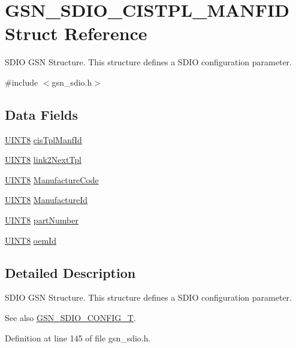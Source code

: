 \hypertarget{a00222}{
\section{GSN\_\-SDIO\_\-CISTPL\_\-MANFID Struct Reference}
\label{a00222}
}


SDIO GSN Structure. This structure defines a SDIO configuration parameter.  




{\ttfamily \#include $<$gsn\_\-sdio.h$>$}

\subsection*{Data Fields}
\begin{DoxyCompactItemize}
\item 
\hyperlink{a00660_gab27e9918b538ce9d8ca692479b375b6a}{UINT8} \hyperlink{a00222_a70e8c53219dd22a1c86848ec328b00b4}{cisTplManfId}
\item 
\hyperlink{a00660_gab27e9918b538ce9d8ca692479b375b6a}{UINT8} \hyperlink{a00222_adb5f177f5de86565991790a9c2c079b5}{link2NextTpl}
\item 
\hyperlink{a00660_gab27e9918b538ce9d8ca692479b375b6a}{UINT8} \hyperlink{a00222_a1dc830a655325e141c7ca76e6f2661d7}{ManufactureCode}
\item 
\hyperlink{a00660_gab27e9918b538ce9d8ca692479b375b6a}{UINT8} \hyperlink{a00222_a56b136b6025997c32451ce3897575e8d}{ManufactureId}
\item 
\hyperlink{a00660_gab27e9918b538ce9d8ca692479b375b6a}{UINT8} \hyperlink{a00222_a274e3be0fc8f4728cd97dff3dde33268}{partNumber}
\item 
\hyperlink{a00660_gab27e9918b538ce9d8ca692479b375b6a}{UINT8} \hyperlink{a00222_a2d15def3c289b0f9e55473db950d31e9}{oemId}
\end{DoxyCompactItemize}


\subsection{Detailed Description}
SDIO GSN Structure. This structure defines a SDIO configuration parameter. 

\begin{DoxySeeAlso}{See also}
\hyperlink{a00653_ga741fda4dc2cd93143a8a73ddaace7de8}{GSN\_\-SDIO\_\-CONFIG\_\-T}. 
\end{DoxySeeAlso}


Definition at line 145 of file gsn\_\-sdio.h.



